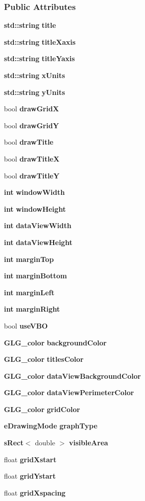 \subsubsection*{Public Attributes}
\begin{DoxyCompactItemize}
\item 
{\bf std\+::string} {\bf title}
\item 
{\bf std\+::string} {\bf title\+Xaxis}
\item 
{\bf std\+::string} {\bf title\+Yaxis}
\item 
{\bf std\+::string} {\bf x\+Units}
\item 
{\bf std\+::string} {\bf y\+Units}
\item 
bool {\bf draw\+GridX}
\item 
bool {\bf draw\+GridY}
\item 
bool {\bf draw\+Title}
\item 
bool {\bf draw\+TitleX}
\item 
bool {\bf draw\+TitleY}
\item 
{\bf int} {\bf window\+Width}
\item 
{\bf int} {\bf window\+Height}
\item 
{\bf int} {\bf data\+View\+Width}
\item 
{\bf int} {\bf data\+View\+Height}
\item 
{\bf int} {\bf margin\+Top}
\item 
{\bf int} {\bf margin\+Bottom}
\item 
{\bf int} {\bf margin\+Left}
\item 
{\bf int} {\bf margin\+Right}
\item 
bool {\bf use\+V\+BO}
\item 
{\bf G\+L\+G\+\_\+color} {\bf background\+Color}
\item 
{\bf G\+L\+G\+\_\+color} {\bf titles\+Color}
\item 
{\bf G\+L\+G\+\_\+color} {\bf data\+View\+Background\+Color}
\item 
{\bf G\+L\+G\+\_\+color} {\bf data\+View\+Perimeter\+Color}
\item 
{\bf G\+L\+G\+\_\+color} {\bf grid\+Color}
\item 
{\bf e\+Drawing\+Mode} {\bf graph\+Type}
\item 
{\bf s\+Rect}$<$ double $>$ {\bf visible\+Area}
\item 
float {\bf grid\+Xstart}
\item 
float {\bf grid\+Ystart}
\item 
float {\bf grid\+Xspacing}

\end{DoxyCompactItemize}
